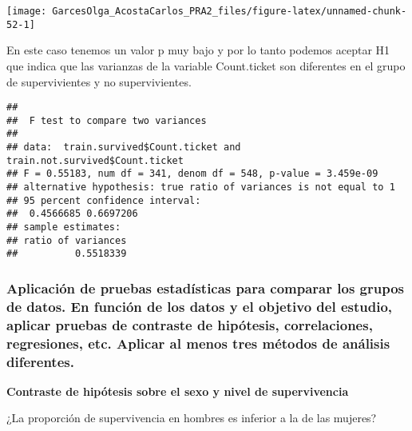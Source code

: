 \documentclass[
]{article}
\newenvironment{Shaded}{\begin{snugshade}}{\end{snugshade}}
\newcommand{\KeywordTok}[1]{\textcolor[rgb]{0.94,0.87,0.69}{#1}}
\newcommand{\NormalTok}[1]{\textcolor[rgb]{0.80,0.80,0.80}{#1}}
\newcommand{\OperatorTok}[1]{\textcolor[rgb]{0.94,0.94,0.82}{#1}}
\begin{document}
\begin{center}\texttt{[image: GarcesOlga\_AcostaCarlos\_PRA2\_files/figure-latex/unnamed-chunk-52-1]} \end{center}

En este caso tenemos un valor p muy bajo y por lo tanto podemos aceptar
H1 que indica que las varianzas de la variable Count.ticket son
diferentes en el grupo de supervivientes y no supervivientes.

\begin{Shaded}
\end{Shaded}

\begin{verbatim}
## 
##  F test to compare two variances
## 
## data:  train.survived$Count.ticket and train.not.survived$Count.ticket
## F = 0.55183, num df = 341, denom df = 548, p-value = 3.459e-09
## alternative hypothesis: true ratio of variances is not equal to 1
## 95 percent confidence interval:
##  0.4566685 0.6697206
## sample estimates:
## ratio of variances 
##          0.5518339
\end{verbatim}

\hypertarget{aplicaciuxf3n-de-pruebas-estaduxedsticas-para-comparar-los-grupos-de-datos.-en-funciuxf3n-de-los-datos-y-el-objetivo-del-estudio-aplicar-pruebas-de-contraste-de-hipuxf3tesis-correlaciones-regresiones-etc.-aplicar-al-menos-tres-muxe9todos-de-anuxe1lisis-diferentes.}{%
\subsubsection{Aplicación de pruebas estadísticas para comparar los
grupos de datos. En función de los datos y el objetivo del estudio,
aplicar pruebas de contraste de hipótesis, correlaciones, regresiones,
etc. Aplicar al menos tres métodos de análisis
diferentes.}\label{aplicaciuxf3n-de-pruebas-estaduxedsticas-para-comparar-los-grupos-de-datos.-en-funciuxf3n-de-los-datos-y-el-objetivo-del-estudio-aplicar-pruebas-de-contraste-de-hipuxf3tesis-correlaciones-regresiones-etc.-aplicar-al-menos-tres-muxe9todos-de-anuxe1lisis-diferentes.}}

\textbf{Contraste de hipótesis sobre el sexo y nivel de supervivencia}

¿La proporción de supervivencia en hombres es inferior a la de las
mujeres?
\end{document}
